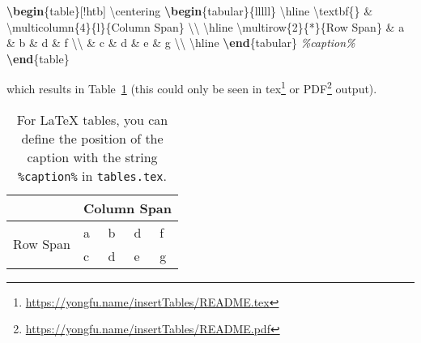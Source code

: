 \documentclass[
]{article}
\newenvironment{Shaded}{}{}
\newcommand{\CommentTok}[1]{\textcolor[rgb]{0.38,0.63,0.69}{\textit{#1}}}
\newcommand{\ExtensionTok}[1]{#1}
\newcommand{\FunctionTok}[1]{\textcolor[rgb]{0.02,0.16,0.49}{#1}}
\newcommand{\KeywordTok}[1]{\textcolor[rgb]{0.00,0.44,0.13}{\textbf{#1}}}
\newcommand{\NormalTok}[1]{#1}
\newcommand{\OperatorTok}[1]{\textcolor[rgb]{0.40,0.40,0.40}{#1}}
\DeclareRobustCommand{\href}[2]{#2\footnote{\url{#1}}}
\begin{document}
\begin{Shaded}
\begin{Highlighting}[]
\KeywordTok{\textbackslash{}begin}\NormalTok{\{}\ExtensionTok{table}\NormalTok{\}[!htb]}
    \FunctionTok{\textbackslash{}centering}
    \KeywordTok{\textbackslash{}begin}\NormalTok{\{}\ExtensionTok{tabular}\NormalTok{\}\{lllll\}}
        \FunctionTok{\textbackslash{}hline}
        \FunctionTok{\textbackslash{}textbf}\NormalTok{\{\} }\OperatorTok{\&} \FunctionTok{\textbackslash{}multicolumn}\NormalTok{\{4\}\{l\}\{Column Span\} }\FunctionTok{\textbackslash{}\textbackslash{}} \FunctionTok{\textbackslash{}hline}
        \FunctionTok{\textbackslash{}multirow}\NormalTok{\{2\}\{*\}\{Row Span\} }\OperatorTok{\&}\NormalTok{ a }\OperatorTok{\&}\NormalTok{ b }\OperatorTok{\&}\NormalTok{ d }\OperatorTok{\&}\NormalTok{ f }\FunctionTok{\textbackslash{}\textbackslash{}}
         \OperatorTok{\&}\NormalTok{ c }\OperatorTok{\&}\NormalTok{ d }\OperatorTok{\&}\NormalTok{ e }\OperatorTok{\&}\NormalTok{ g }\FunctionTok{\textbackslash{}\textbackslash{}} \FunctionTok{\textbackslash{}hline}
        \KeywordTok{\textbackslash{}end}\NormalTok{\{}\ExtensionTok{tabular}\NormalTok{\}}
    \CommentTok{\%caption\%}
\KeywordTok{\textbackslash{}end}\NormalTok{\{}\ExtensionTok{table}\NormalTok{\}}
\end{Highlighting}
\end{Shaded}

which results in Table~\ref{tbl:custom-caption-position} (this could
only be seen in \href{https://yongfu.name/insertTables/README.tex}{tex}
or \href{https://yongfu.name/insertTables/README.pdf}{PDF} output).

\begin{table}[!htb]
    \centering
    \begin{tabular}{lllll}
        \hline
        \textbf{} & \multicolumn{4}{l}{Column Span} \\ \hline
        \multirow{2}{*}{Row Span} & a & b & d & f \\
         & c & d & e & g \\ \hline
        \end{tabular}
    \caption{\label{tbl:custom-caption-position}For LaTeX tables, you can define the position of the caption with the string \texttt{\%caption\%} in \texttt{tables.tex}.}
\end{table}
\end{document}
